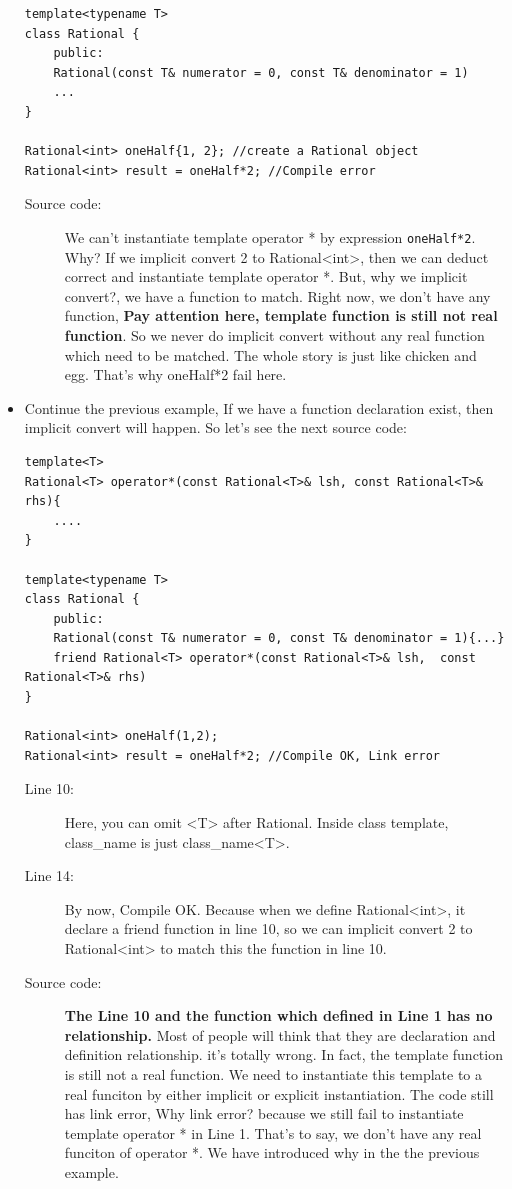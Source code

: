 \documentclass[a4paper,11pt,twoside]{book}
\begin{document}
\begin{itemize}
\begin{lstlisting}
template<typename T>
class Rational {
	public:
	Rational(const T& numerator = 0, const T& denominator = 1)
	...
} 

Rational<int> oneHalf{1, 2}; //create a Rational object
Rational<int> result = oneHalf*2; //Compile error		
\end{lstlisting}	
	\begin{description}
		\item[Source code:] We can't instantiate template operator * by expression \texttt{oneHalf*2}. Why? If we implicit convert 2 to Rational<int>, then we can deduct correct and instantiate template operator *. But, why we implicit convert?, we have a function to match. Right now, we don't have any function, \textbf{Pay attention here, template function is still not real function}. So we never do implicit convert without any real function which need to be matched.  The whole story is just like chicken and egg. That's why oneHalf*2 fail here. 
	\end{description}
	
	\item Continue the previous example, If we have a function declaration exist, then implicit convert will happen. So let's see the next source code:
\begin{lstlisting}
template<T>
Rational<T> operator*(const Rational<T>& lsh, const Rational<T>& rhs){
	....
}

template<typename T>
class Rational {
	public:
	Rational(const T& numerator = 0, const T& denominator = 1){...}
	friend Rational<T> operator*(const Rational<T>& lsh,  const Rational<T>& rhs)
} 

Rational<int> oneHalf(1,2);
Rational<int> result = oneHalf*2; //Compile OK, Link error		
\end{lstlisting}	
	\begin{description}
		\item[Line 10:] Here, you can omit <T> after Rational. Inside class template, class\_name is just class\_name<T>.
		
		\item[Line 14:] By now, Compile OK. Because when we define Rational<int>, it declare a friend function in line 10, so we can implicit convert 2 to Rational<int> to match this the function in line 10.
		
		\item[Source code:] \textbf{The Line 10 and the function which defined in Line 1 has no relationship.} Most of people will think that they are declaration and definition relationship. it's totally wrong. In fact, the template function is still not a real function.  We need to instantiate this template to a real funciton by either implicit or explicit instantiation. The code still has link error, Why link error? because we still fail to instantiate template operator * in Line 1. That's to say, we don't have any real funciton of operator *. We have introduced why in the the previous example.
	\end{description}
	

\end{itemize}
\end{document}
